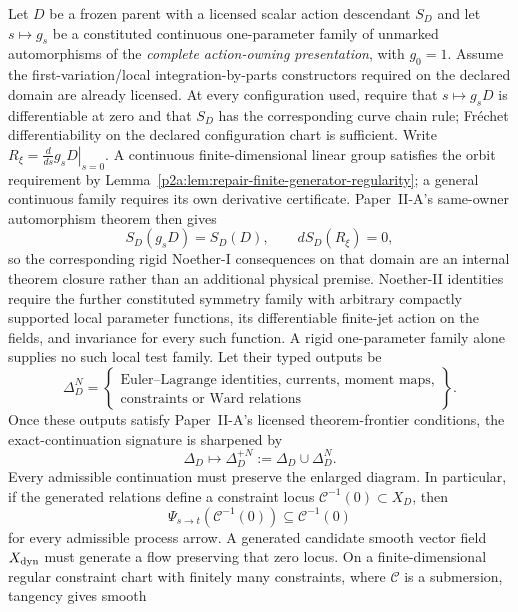 \documentclass[12pt,a4paper]{article}
\begin{document}
\begin{theorem}
\label{p3a:thm:v149-native-noether-frontier}
\label{p3a:thm:v176-action-generated-noether-frontier}
Let \(D\) be a frozen parent with a licensed scalar action descendant \(S_D\)
and let \(s\mapsto g_s\) be a constituted continuous one-parameter family of
unmarked automorphisms of the \emph{complete action-owning presentation},
with $g_0=1$. Assume the first-variation/local integration-by-parts constructors required on
the declared domain are already licensed. At every configuration used,
require that $s\mapsto g_sD$ is differentiable at zero and that $S_D$ has
the corresponding curve chain rule; Fr\'echet differentiability on the
declared configuration chart is sufficient. Write
$R_\xi=\left.\frac{d}{ds}g_sD\right|_{s=0}$. A continuous finite-dimensional
linear group satisfies the orbit requirement by
Lemma~\ref{p2a:lem:repair-finite-generator-regularity}; a general continuous
family requires its own derivative certificate. Paper~II-A's same-owner
automorphism theorem then gives
\[
 S_D(g_sD)=S_D(D),
 \qquad
 dS_D(R_\xi)=0,
\]
so the corresponding rigid Noether-I consequences on that domain are an internal
theorem closure rather than an additional physical premise.  Noether-II
identities require the further constituted symmetry family with arbitrary
compactly supported local parameter functions, its differentiable finite-jet
action on the fields, and invariance for every such function. A rigid
one-parameter family alone supplies no such local test family. Let their typed
outputs be
\[
 \Delta_D^{N}
 =\left\{\begin{gathered}
 \text{Euler--Lagrange identities, currents, moment maps,}\\
 \text{constraints or Ward relations}
 \end{gathered}\right\}.
\]
Once these outputs satisfy Paper~II-A's licensed theorem-frontier conditions,
the exact-continuation signature is sharpened by
\[
 \boxed{\Delta_D\longmapsto
 \Delta_D^{+N}:=\Delta_D\cup\Delta_D^{N}.}
\]
Every admissible continuation must preserve the enlarged diagram.  In
particular, if the generated relations define a constraint locus
\(\mathcal C^{-1}(0)\subset X_D\), then
\[
 \boxed{
 \Psi_{s\to t}(\mathcal C^{-1}(0))
 \subseteq \mathcal C^{-1}(0)}
\]
for every admissible process arrow. A generated candidate smooth vector
field $X_{\rm dyn}$ must generate a flow preserving that zero locus.
On a finite-dimensional regular constraint chart with finitely many
constraints, where $\mathcal C$ is a submersion, tangency gives smooth

\end{theorem}
\end{document}
